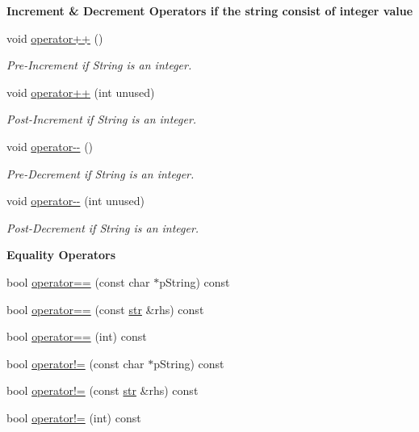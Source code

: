 \begin{Indent}{\bf Increment \& Decrement Operators if the string consist of integer value}\par
\begin{DoxyCompactItemize}
\item 
void \hyperlink{classstr_ad59c73265a45deb506d5d3ebdbc6fc1b}{operator++} ()
\begin{DoxyCompactList}\small\item\em Pre-\/\+Increment if String is an integer. \end{DoxyCompactList}\item 
void \hyperlink{classstr_a3348bd851c63d3388843d9a2c16925ac}{operator++} (int unused)
\begin{DoxyCompactList}\small\item\em Post-\/\+Increment if String is an integer. \end{DoxyCompactList}\item 
void \hyperlink{classstr_ae93a7a134369044d32ae0d508d7801e5}{operator-\/-\/} ()
\begin{DoxyCompactList}\small\item\em Pre-\/\+Decrement if String is an integer. \end{DoxyCompactList}\item 
void \hyperlink{classstr_a766fafbafba96030a73c9e27d00b8d30}{operator-\/-\/} (int unused)
\begin{DoxyCompactList}\small\item\em Post-\/\+Decrement if String is an integer. \end{DoxyCompactList}\end{DoxyCompactItemize}
\end{Indent}
\begin{Indent}{\bf Equality Operators}\par
\begin{DoxyCompactItemize}
\item 
bool \hyperlink{classstr_a73bea05d9dd7b126c483fbbe5606e30c}{operator==} (const char $\ast$p\+String) const 
\item 
bool \hyperlink{classstr_ad3462670311008c868e6e607a60da85e}{operator==} (const \hyperlink{classstr}{str} \&rhs) const 
\item 
bool \hyperlink{classstr_a8e03a63b79d2d4c3a97751c8e001e065}{operator==} (int) const 
\item 
bool \hyperlink{classstr_a76154ba2d7fd29befe770d5921ba35c8}{operator!=} (const char $\ast$p\+String) const 
\item 
bool \hyperlink{classstr_af60bb0eef0240663294a13b628f46ae0}{operator!=} (const \hyperlink{classstr}{str} \&rhs) const 
\item 
bool \hyperlink{classstr_a1f70d269ce72f1325753746714e08a32}{operator!=} (int) const 
\end{DoxyCompactItemize}
\end{Indent}
